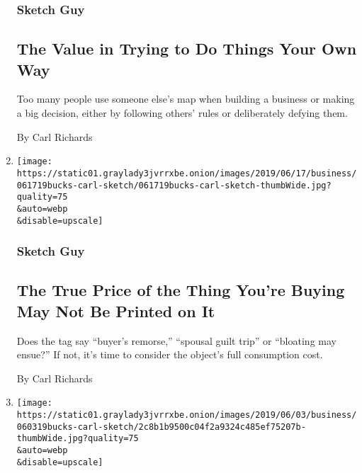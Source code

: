 \begin{enumerate}
  \hypertarget{sketch-guy-4}{%
  \subsubsection{Sketch Guy}\label{sketch-guy-4}}

  \hypertarget{the-value-in-trying-to-do-things-your-own-way}{%
  \subsection{The Value in Trying to Do Things Your Own
  Way}\label{the-value-in-trying-to-do-things-your-own-way}}

  Too many people use someone else's map when building a business or
  making a big decision, either by following others' rules or
  deliberately defying them.

  By Carl Richards
\item
  \href{/2019/06/17/business/the-true-price-of-the-thing-youre-buying-may-not-be-printed-on-it.html}{}

  \texttt{[image: https://static01.graylady3jvrrxbe.onion/images/2019/06/17/business/061719bucks-carl-sketch/061719bucks-carl-sketch-thumbWide.jpg?quality=75\\\&auto=webp\\\&disable=upscale]}

  \hypertarget{sketch-guy-5}{%
  \subsubsection{Sketch Guy}\label{sketch-guy-5}}

  \hypertarget{the-true-price-of-the-thing-youre-buying-may-not-be-printed-on-it}{%
  \subsection{The True Price of the Thing You're Buying May Not Be
  Printed on
  It}\label{the-true-price-of-the-thing-youre-buying-may-not-be-printed-on-it}}

  Does the tag say ``buyer's remorse,'' ``spousal guilt trip'' or
  ``bloating may ensue?'' If not, it's time to consider the object's
  full consumption cost.

  By Carl Richards
\item
  \href{/2019/06/03/your-money/sketch-guy-time-outside-nature.html}{}

  \texttt{[image: https://static01.graylady3jvrrxbe.onion/images/2019/06/03/business/060319bucks-carl-sketch/2c8b1b9500c04f2a9324c485ef75207b-thumbWide.jpg?quality=75\\\&auto=webp\\\&disable=upscale]}


\end{enumerate}
